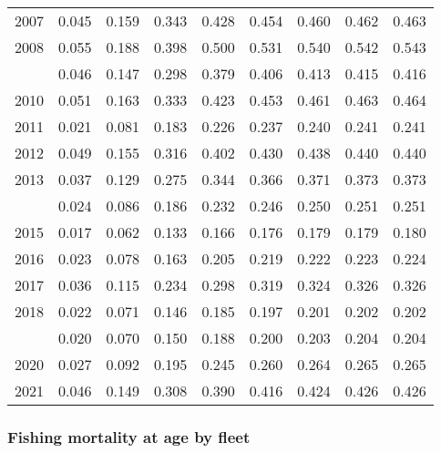 \documentclass[
]{article}
\begin{document}
\begin{longtable}[t]{lrrrrrrrr}
2007 & 0.045 & 0.159 & 0.343 & 0.428 & 0.454 & 0.460 & 0.462 & 0.463\\
2008 & 0.055 & 0.188 & 0.398 & 0.500 & 0.531 & 0.540 & 0.542 & 0.543\\
\addlinespace
2009 & 0.046 & 0.147 & 0.298 & 0.379 & 0.406 & 0.413 & 0.415 & 0.416\\
2010 & 0.051 & 0.163 & 0.333 & 0.423 & 0.453 & 0.461 & 0.463 & 0.464\\
2011 & 0.021 & 0.081 & 0.183 & 0.226 & 0.237 & 0.240 & 0.241 & 0.241\\
2012 & 0.049 & 0.155 & 0.316 & 0.402 & 0.430 & 0.438 & 0.440 & 0.440\\
2013 & 0.037 & 0.129 & 0.275 & 0.344 & 0.366 & 0.371 & 0.373 & 0.373\\
\addlinespace
2014 & 0.024 & 0.086 & 0.186 & 0.232 & 0.246 & 0.250 & 0.251 & 0.251\\
2015 & 0.017 & 0.062 & 0.133 & 0.166 & 0.176 & 0.179 & 0.179 & 0.180\\
2016 & 0.023 & 0.078 & 0.163 & 0.205 & 0.219 & 0.222 & 0.223 & 0.224\\
2017 & 0.036 & 0.115 & 0.234 & 0.298 & 0.319 & 0.324 & 0.326 & 0.326\\
2018 & 0.022 & 0.071 & 0.146 & 0.185 & 0.197 & 0.201 & 0.202 & 0.202\\
\addlinespace
2019 & 0.020 & 0.070 & 0.150 & 0.188 & 0.200 & 0.203 & 0.204 & 0.204\\
2020 & 0.027 & 0.092 & 0.195 & 0.245 & 0.260 & 0.264 & 0.265 & 0.265\\
2021 & 0.046 & 0.149 & 0.308 & 0.390 & 0.416 & 0.424 & 0.426 & 0.426\\*
\end{longtable}

\hypertarget{fishing-mortality-at-age-by-fleet}{%
\subsubsection{Fishing mortality at age by
fleet}\label{fishing-mortality-at-age-by-fleet}}
\end{document}
